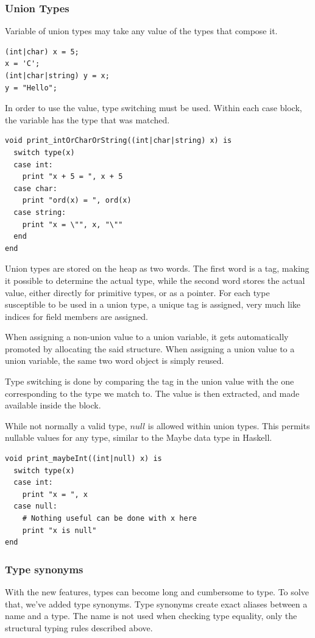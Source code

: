\documentclass{article}
\begin{document}
\subsubsection{Union Types}
Variable of union types may take any value of the types that compose it.
\begin{lstlisting}
(int|char) x = 5;
x = 'C';
(int|char|string) y = x;
y = "Hello";
\end{lstlisting}

In order to use the value, type switching must be used. Within each case block, the variable has the type that was
matched.
\begin{lstlisting}
void print_intOrCharOrString((int|char|string) x) is
  switch type(x)
  case int:
    print "x + 5 = ", x + 5
  case char:
    print "ord(x) = ", ord(x)
  case string:
    print "x = \"", x, "\""
  end
end
\end{lstlisting}

Union types are stored on the heap as two words. The first word is a tag, making it possible to determine the actual
type, while the second word stores the actual value, either directly for primitive types, or as a pointer.
For each type susceptible to be used in a union type, a unique tag is assigned, very much like indices for field members
are assigned.

When assigning a non-union value to a union variable, it gets automatically promoted by allocating the said structure.
When assigning a union value to a union variable, the same two word object is simply reused.

Type switching is done by comparing the tag in the union value with the one corresponding to the type we match to.
The value is then extracted, and made available inside the block.

While not normally a valid type, $null$ is allowed within union types. This permits nullable values for any type, similar to the Maybe data type in Haskell.
\begin{lstlisting}
void print_maybeInt((int|null) x) is
  switch type(x)
  case int:
    print "x = ", x
  case null:
    # Nothing useful can be done with x here
    print "x is null"
end
\end{lstlisting}

\subsubsection{Type synonyms}
With the new features, types can become long and cumbersome to type. To solve that, we've added type synonyms. Type synonyms
create exact aliases between a name and a type. The name is not used when checking type equality, only the structural typing
rules described above.
\end{document}
